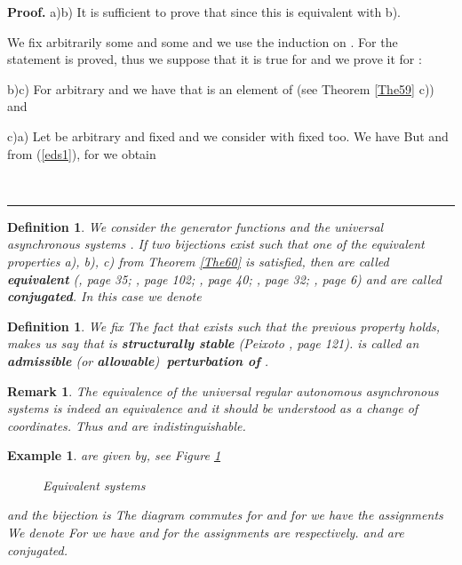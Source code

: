 \documentclass[12pt]{article}\usepackage{amsmath}
\newtheorem{definition}[theorem]{Definition}
\newtheorem{example}[theorem]{Example}
\newtheorem{remark}[theorem]{Remark}
\newenvironment{proof}[1][Proof]{\textbf{#1.} }{\ \rule{0.5em}{0.5em}}
\begin{document}
\begin{proof}
a)b) It is sufficient to prove that 
since this is equivalent with b).

We fix arbitrarily some  and some  and we use the induction on
. For  the statement is proved, thus we suppose that it is true for
 and we prove it for :


b)c) For arbitrary  and 
 we have that
is an element of  (see Theorem \ref{The59} c)) and


c)a) Let  be arbitrary and fixed
and we consider 
with  fixed too. We have
But
and from (\ref{eds1}), for  we obtain

\end{proof}

\begin{definition}
\label{Def160}We consider the generator functions  and the universal asynchronous systems
 . If two bijections  exist such that one of the equivalent
properties a), b), c) from Theorem \ref{The60} is satisfied, then  are called \textbf{equivalent} (\cite{bib4}, page 35;
\cite{bib6}, page 102; \cite{bib1}, page 40; \cite{bib2}, page 32;
\cite{bib5}, page 6) and  are called \textbf{conjugated}. In this
case we denote 
\end{definition}

\begin{definition}
\label{Def161}We fix  The fact that  exists such that the
previous property holds, makes us say that  is \textbf{structurally
stable} (Peixoto \cite{bib6}, page 121).  is called an
\textbf{admissible} (or \textbf{allowable})\textbf{\ perturbation of} .
\end{definition}

\begin{remark}
The equivalence of the universal regular autonomous asynchronous systems is
indeed an equivalence and it should be understood as a change of coordinates.
Thus  and  are indistinguishable.
\end{remark}

\begin{example}
 are given by, see Figure
\ref{echiv1}\begin{figure}
[ptb]
\begin{center}
\caption{Equivalent systems}\label{echiv1}\end{center}
\end{figure}

and the bijection  is
The diagram
commutes for  and for  we have
the assignments
We denote 
For  we have
and for  the assignments are
respectively.  and  are conjugated.
\end{example}
\end{document}
